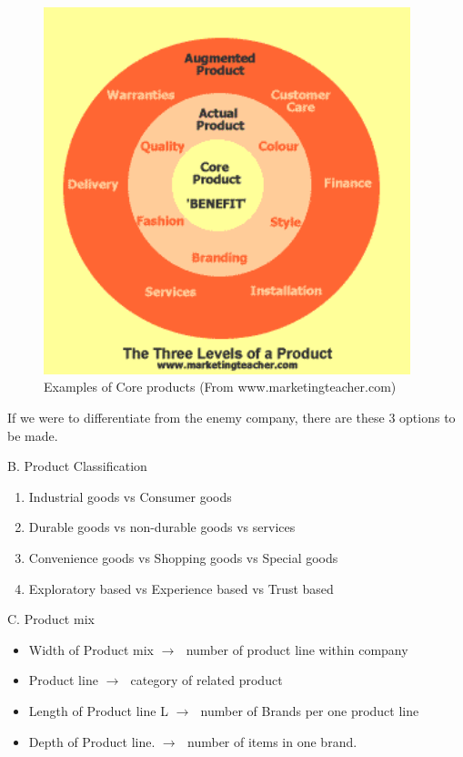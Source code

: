 \documentclass[12pt]{article}
\newcommand{\ra}{$\rightarrow \text{ }$}
\begin{document}
\begin{figure}[H]
	\centering
	\includegraphics[width=0.95\textwidth]{img/caa.png}
	\caption{Examples of Core products (From www.marketingteacher.com)}
	\label{}
\end{figure}
If we were to differentiate from the enemy company, there are these 3 options to be made.

B. Product Classification

\begin{enumerate}
	\item Industrial goods vs Consumer goods
	\item  Durable goods vs non-durable goods vs services %
	\item Convenience goods vs Shopping goods vs Special goods
	\item  Exploratory based vs Experience based vs Trust based
\end{enumerate}

C. Product mix

\begin{itemize}
	\item Width of Product mix \ra number of product line within company
	\item Product line \ra category of related product
	\item Length of Product line L \ra number of Brands per one product line
	\item Depth of Product line. \ra number of items in one brand.
\end{itemize}
\end{document}
